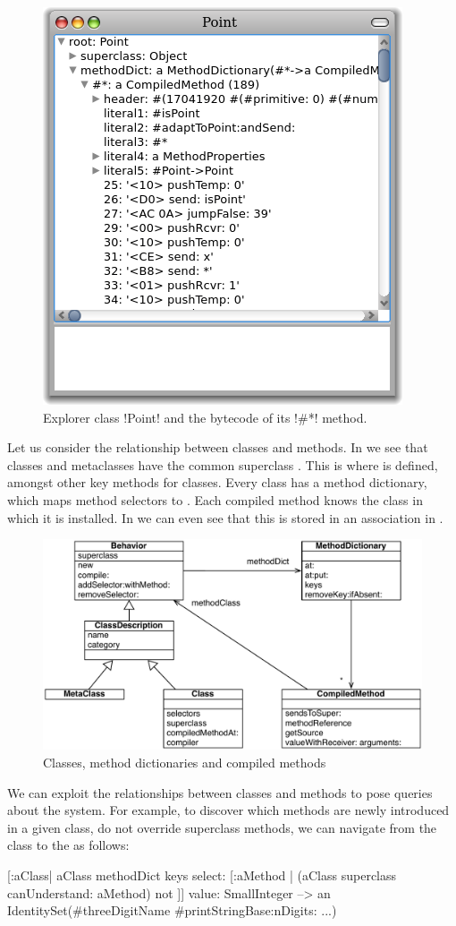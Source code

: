 \documentclass[a4paper,10pt,twoside]{book}
\begin{document}
{\begin{figure}[ht]\centering
	\includegraphics[width=.5\linewidth]{CompiledMethod}
	\caption{Explorer class \ct!Point! and the bytecode of its \ct!\#*! method.}
\end{figure}

Let us consider the relationship between classes and methods.
In  we see that classes and metaclasses have the common superclass . This is where  is defined, amongst other key methods for classes.
Every class has a method dictionary, which maps method selectors to .
Each compiled method knows the class in which it is installed.
In  we can even see that this is stored in an association in .

\begin{figure}[ht]\centering
	\includegraphics[width=\linewidth]{MethodsAsObjects}
	\caption{Classes, method dictionaries and compiled methods}
\end{figure}

We can exploit the relationships between classes and methods to pose queries about the system.
For example, to discover which methods are newly introduced in a given class, \ie do not override superclass methods, we can navigate from the class to the  as follows:
\begin{code}{}
[:aClass| aClass methodDict keys select: [:aMethod |
  (aClass superclass canUnderstand: aMethod) not ]] value: SmallInteger
  --> an IdentitySet(#threeDigitName #printStringBase:nDigits: ...)
\end{code}

}
\end{document}
